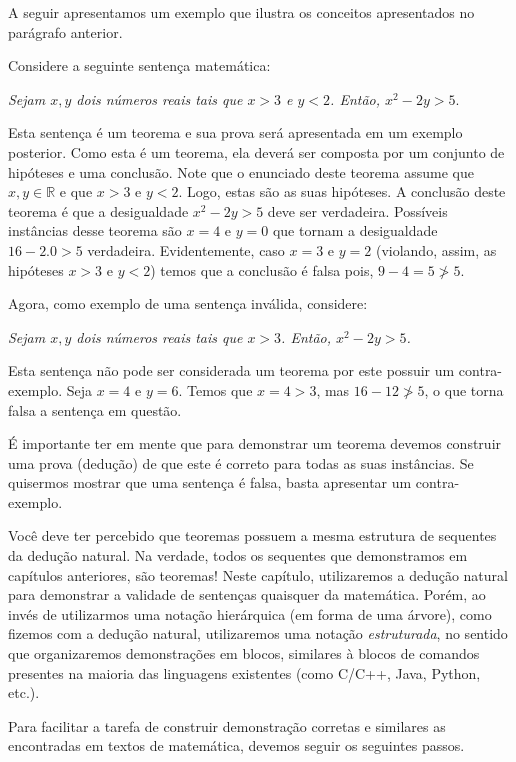 A seguir apresentamos um exemplo que ilustra os conceitos apresentados
no parágrafo anterior.

\begin{Example}
Considere a seguinte sentença matemática:
\begin{center}
\textit{Sejam $x,y$ dois números reais tais que $x > 3$ e $y < 2$. Então, $x^2
- 2y > 5$}.
\end{center}
Esta sentença é um teorema e sua prova será apresentada em um exemplo
posterior. Como esta é um teorema, ela deverá ser composta por um
conjunto de hipóteses e uma conclusão. Note que o enunciado deste
teorema assume que $x,y\in\mathbb{R}$ e que $x > 3$ e $y < 2$. Logo,
estas são as suas hipóteses. A conclusão deste teorema é que
a desigualdade $x^2 - 2y > 5$ deve ser verdadeira. Possíveis
instâncias desse teorema são $x = 4$ e $y = 0$ que tornam a
desigualdade $16 - 2.0 > 5$ verdadeira. Evidentemente, caso $x = 3$ e
$y = 2$ (violando, assim, as hipóteses $x > 3$ e $y < 2$) temos que a
conclusão é falsa pois, $9 - 4 = 5 \not> 5$.

Agora, como exemplo de uma sentença inválida, considere:
\begin{center}
\textit{Sejam $x,y$ dois números reais tais que $x > 3$. Então, $x^2
- 2y > 5$.}
\end{center}
Esta sentença não pode ser considerada um teorema por este possuir um
contra-exemplo. Seja $x= 4$ e $y = 6$. Temos que $x = 4 > 3$, mas
$16 - 12 \not > 5$, o que torna falsa a sentença em questão.

É importante ter em mente que para demonstrar um teorema devemos
construir uma prova (dedução) de que este é correto para todas as suas
instâncias. Se quisermos mostrar que uma sentença é falsa, basta
apresentar um contra-exemplo.
\end{Example}

Você deve ter percebido que
teoremas possuem a mesma estrutura de sequentes da dedução
natural. Na verdade, todos os sequentes que demonstramos em capítulos
anteriores, são teoremas! Neste capítulo, utilizaremos a dedução
natural para demonstrar a validade de sentenças quaisquer da
matemática. Porém, ao invés de utilizarmos uma notação hierárquica (em
forma de uma árvore), como fizemos com a dedução natural, utilizaremos
uma notação \textit{estruturada}, no sentido que organizaremos
demonstrações em blocos, similares à blocos de comandos presentes na
maioria das linguagens existentes (como C/C++, Java, Python,
etc.).

Para facilitar a tarefa de construir demonstração corretas e similares
as encontradas em textos de matemática, devemos seguir os seguintes passos.
